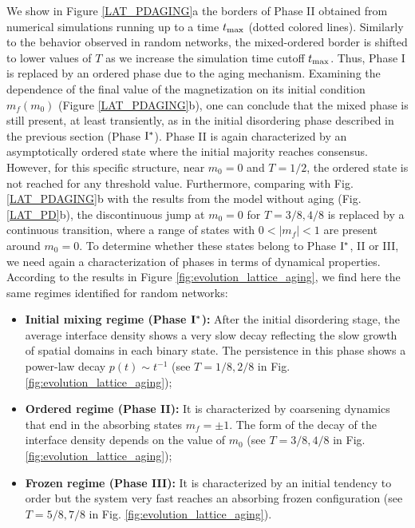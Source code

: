 We show in Figure \ref{LAT_PDAGING}a the borders of Phase II obtained from numerical simulations running up to a time $t_{\rm max}$ (dotted colored lines). Similarly to the behavior observed in random networks, the mixed-ordered border is shifted to lower values of $T$ as we increase the simulation time cutoff $t_{\rm max}$. Thus, Phase I is replaced by an ordered phase due to the aging mechanism. Examining the dependence of the final value of the magnetization on its initial condition  $m_f(m_0)$  (Figure \ref{LAT_PDAGING}b), one can conclude that the mixed phase is still present, at least transiently, as in the initial disordering phase described in the previous section (Phase ${\rm I}^{*}$). Phase II is again characterized by an asymptotically ordered state where the initial majority reaches consensus. However, for this specific structure, near $m_0 = 0$ and $T = 1/2$, the ordered state is not reached for any threshold value. Furthermore, comparing with Fig. \ref{LAT_PDAGING}b with the results from the model without aging (Fig. \ref{LAT_PD}b), the discontinuous jump at $m_0 = 0$ for $T = 3/8, 4/8$ is replaced by a continuous transition, where a range of states with $0 < |m_f| < 1$ are present around $m_0 = 0$. To determine whether these states belong to Phase ${\rm I}^{*}$, II or III, we need again a characterization of phases in terms of dynamical properties. According to the results in Figure \ref{fig:evolution_lattice_aging}, we find here the same regimes identified for random networks:
\begin{itemize}
    \item \textbf{Initial mixing regime (Phase ${\rm {\bf I}}^{*}$):}  After the initial disordering stage, the average interface density shows a very slow decay reflecting the slow growth of spatial domains in each binary state. The persistence in this phase shows a power-law decay $p(t) \sim t^{-1}$ (see $T = 1/8,2/8$ in Fig. \ref{fig:evolution_lattice_aging});
    \item \textbf{Ordered regime (Phase II):} It is characterized by coarsening dynamics that end in the absorbing states $m_f = \pm 1$. The form of the decay of the interface density depends on the value of $m_0$ (see $T = 3/8,4/8$ in Fig. \ref{fig:evolution_lattice_aging});
    \item \textbf{Frozen regime (Phase III):} It is characterized by an initial tendency to order but the system very fast reaches an absorbing frozen configuration (see $T = 5/8,7/8$ in Fig. \ref{fig:evolution_lattice_aging}).
\end{itemize}

